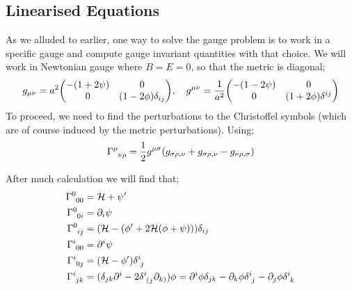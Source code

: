 \subsection{Linearised Equations}
As we alluded to earlier, one way to solve the gauge problem is to work in a specific gauge and compute gauge invariant quantities with that choice. We will work in Newtonian gauge where $B = E = 0$, so that the metric is diagonal;
\begin{equation*}
g_{\mu\nu} = a^2 \twobytwo{-(1 + 2\psi)}{0}{0}{(1 - 2\phi)\delta_{ij}}, \quad g^{\mu\nu} = \frac{1}{a^2}\twobytwo{-(1 - 2\psi)}{0}{0}{(1 + 2\phi)\delta^{ij}}
\end{equation*}
To proceed, we need to find the perturbations to the Christoffel symbols (which are of course induced by the metric perturbations). Using;
\begin{equation*}
\Gamma\indices{^{\mu}_{\nu\rho}} = \frac{1}{2}g^{\mu\sigma}(g_{\sigma\rho, \nu} + g_{\sigma\rho, \nu} - g_{\nu\rho, \sigma})
\end{equation*}
\begin{definitionbox}
After much calculation we will find that;
\begin{align}
\Gamma\indices{^{0}_{00}} &= \hamilt + \psi\pr \\
\Gamma\indices{^{0}_{0i}} &= \del_i \psi \\
\Gamma\indices{^{0}_{ij}} &= \left(\hamilt - \left(\phi\pr + 2\hamilt(\phi + \psi)\right)\right)\delta_{ij} \\
\Gamma\indices{^{i}_{00}} &= \del^i \psi \\
\Gamma\indices{^{i}_{0j}} &= (\hamilt - \phi\pr)\delta\indices{^{i}_{j}} \\
\Gamma\indices{^{i}_{jk}} &= (\delta_{jk}\del^i - 2\delta\indices{^{i}_{(j}}\del_{k)})\phi = \del^i \phi \delta_{jk} - \del_k \phi \delta\indices{^{i}_{j}} - \del_j \phi \delta\indices{^{i}_{k}}
\end{align}
\end{definitionbox}
